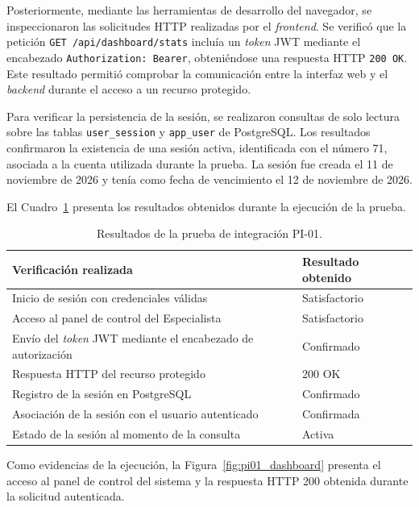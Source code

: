 Posteriormente, mediante las herramientas de desarrollo del navegador, se inspeccionaron las solicitudes HTTP realizadas por el \textit{frontend}. Se verificó que la petición \texttt{GET /api/dashboard/stats} incluía un \textit{token} JWT mediante el encabezado \texttt{Authorization: Bearer}, obteniéndose una respuesta HTTP \texttt{200 OK}. Este resultado permitió comprobar la comunicación entre la interfaz web y el \textit{backend} durante el acceso a un recurso protegido.

Para verificar la persistencia de la sesión, se realizaron consultas de solo lectura sobre las tablas \texttt{user\_session} y \texttt{app\_user} de PostgreSQL. Los resultados confirmaron la existencia de una sesión activa, identificada con el número 71, asociada a la cuenta utilizada durante la prueba. La sesión fue creada el 11 de noviembre de 2026 y tenía como fecha de vencimiento el 12 de noviembre de 2026.

El Cuadro~\ref{tab:pi01_resultados} presenta los resultados obtenidos durante la ejecución de la prueba.

\begin{table}[htbp]
    \centering
    \caption{Resultados de la prueba de integración PI-01.}
    \label{tab:pi01_resultados}
    \small
    \begin{tabular}{|p{}|p{}|}
        \hline
        \textbf{Verificación realizada} & \textbf{Resultado obtenido} \\
        \hline
        Inicio de sesión con credenciales válidas & Satisfactorio \\
        \hline
        Acceso al panel de control del Especialista & Satisfactorio \\
        \hline
        Envío del \textit{token} JWT mediante el encabezado de autorización & Confirmado \\
        \hline
        Respuesta HTTP del recurso protegido & 200 OK \\
        \hline
        Registro de la sesión en PostgreSQL & Confirmado \\
        \hline
        Asociación de la sesión con el usuario autenticado & Confirmada \\
        \hline
        Estado de la sesión al momento de la consulta & Activa \\
        \hline
    \end{tabular}
\end{table}


Como evidencias de la ejecución, la
Figura~\ref{fig:pi01_dashboard} presenta el acceso
al panel de control del sistema y la respuesta
HTTP 200 obtenida durante la solicitud autenticada.


